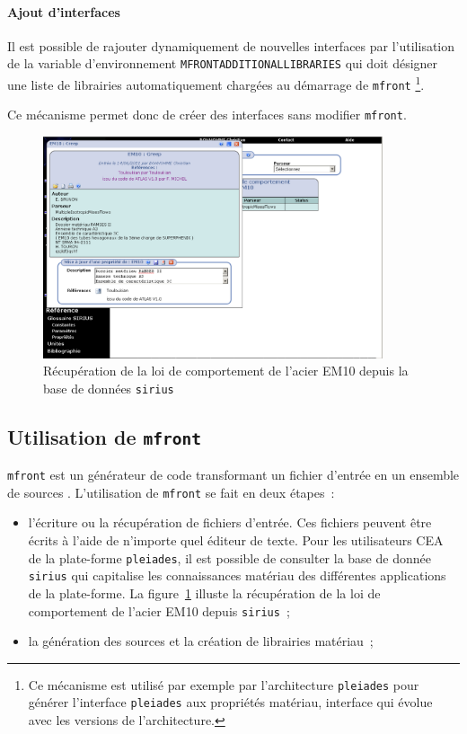 \documentclass[rectoverso,pleiades,pstricks,leqno,anti]{texmf/note_technique_2010}
\newcommand{\pleiades}{\texttt{pleiades}}
\newcommand{\mfront}{\texttt{mfront}}
\newcommand{\sirius}{\texttt{sirius}}
\def\ifmonospace{\ifdim\fontdimen3\font=0pt }
\def\cpp{%
\ifmonospace%
    C++%
\else%
    C\kern-.1667em\raise.30ex\hbox{\smaller{++}}%
\fi%
\spacefactor1000 }
\newcommand{\cea}{CEA}
\begin{document}
\paragraph{Ajout d'interfaces} Il est possible de rajouter dynamiquement
de nouvelles interfaces par l'utilisation de la variable d'environnement
{\tt MFRONT\textunderscore{}\-ADDITIONAL\textunderscore{}\-LIBRARIES}
qui doit désigner une liste de librairies automatiquement chargées au
démarrage de \mfront{} \footnote{Ce mécanisme est utilisé par exemple
  par l'architecture \pleiades{} pour générer l'interface {\tt pleiades}
  aux propriétés matériau, interface qui évolue avec les versions de
  l'architecture.}.

Ce mécanisme permet donc de créer des interfaces sans modifier
\mfront{}.

\begin{figure}
  \center
  \includegraphics[width=10cm]{Images/sirius8.eps}
  \caption{Récupération de la loi de comportement
    de l'acier EM10 depuis la base de données \sirius{}}
  \label{fig:sirius8}
\end{figure}

\subsection{Utilisation de \mfront{}}
\label{sec:mfront:using}

\mfront{} est un générateur de code transformant un fichier
d'entrée en un ensemble de sources \cpp{}. L'utilisation de \mfront{} se
fait en deux étapes~:
\begin{itemize}
  \item l'écriture ou la récupération de fichiers d'entrée. Ces
  fichiers peuvent être écrits à l'aide de n'importe quel éditeur de
  texte. Pour les utilisateurs \cea{} de la plate-forme \pleiades{}, il
  est possible de consulter la base de donnée \sirius{} qui capitalise
  les connaissances matériau des différentes applications de la
  plate-forme. La figure~\ref{fig:sirius8} illuste la récupération de la
  loi de comportement de l'acier EM10 depuis \sirius{}~;
  \item la génération des sources \cpp{} et la création de
  librairies matériau~;
\end{itemize}
\end{document}
